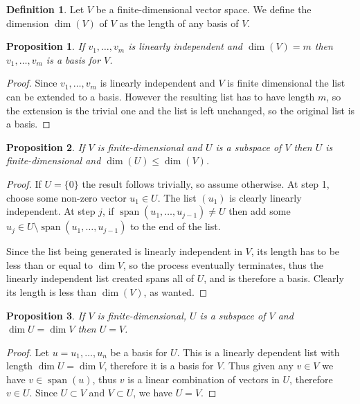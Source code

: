 \documentclass{article}
\newtheorem{proposition}{Proposition}[subsection]
\theoremstyle{definition}
\newtheorem{definition}{Definition}[subsection]
\theoremstyle{remark}
\DeclareMathOperator{\Span}{span}
\newcommand{\set}[1]{\{#1\}}
\begin{document}
\begin{definition}
    Let $V$ be a finite-dimensional vector space. We define the dimension $\dim(V)$ of $V$ as the length of any basis of $V$.
\end{definition}

\begin{proposition}
   If $v_1, \dots, v_m$ is linearly independent and $\dim(V) = m$ then $v_1, \dots, v_m$ is a basis for $V$.
\end{proposition}

\begin{proof}
    Since $v_1, \dots, v_m$ is linearly independent and $V$ is finite dimensional the list can be extended to a basis. However the resulting list has to have length $m$, so the extension is the trivial one and the list is left unchanged, so the original list is a basis.
\end{proof}

\begin{proposition} \label{prop_dim_of_subspace}
   If $V$ is finite-dimensional and $U$ is a subspace of $V$ then $U$ is finite-dimensional and $\dim(U) \leq \dim(V)$.
\end{proposition}

\begin{proof}
    If $U = \set{0}$ the result follows trivially, so assume otherwise. At step 1, choose some non-zero vector $u_1 \in U$. The list $(u_1)$ is clearly linearly independent. At step $j$, if $\Span(u_1, \dots, u_{j-1}) \neq U$ then add some $u_j \in U \setminus \Span(u_1, \dots, u_{j-1})$ to the end of the list.
    
    Since the list being generated is linearly independent in $V$, its length has to be less than or equal to $\dim{V}$, so the process eventually terminates, thus the linearly independent list created spans all of $U$, and is therefore a basis. Clearly its length is less than $\dim(V)$, as wanted.
    
\end{proof}

\begin{proposition} \label{prop_subspace_of_same_dimension}
   If $V$ is finite-dimensional, $U$ is a subspace of $V$ and $\dim{U} = \dim{V}$ then $U = V$.
\end{proposition}

\begin{proof}
    Let $u = u_1, \dots, u_n$ be a basis for $U$. This is a linearly dependent list with length $\dim{U} = \dim{V}$, therefore it is a basis for $V$. Thus given any $v \in V$ we have $v \in \Span(u)$, thus $v$ is a linear combination of vectors in $U$, therefore $v \in U$. Since $U \subset V$ and $V \subset U$, we have $U = V$.
\end{proof}
\end{document}
